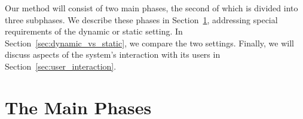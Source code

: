 Our method will consist of two main phases, the second of which is divided
into three subphases.
We describe these phases in Section~\ref{sec:phases},
addressing special requirements of the dynamic or static setting.
In Section~\ref{sec:dynamic_vs_static}, we compare the two settings.
Finally, we will discuss aspects of the system's interaction with its users
in Section~\ref{sec:user_interaction}.

\section{The Main Phases}
\label{sec:phases}

\newlength{\mainphases}%
\newlength{\subphases}\settowidth{\subphases}{\fns Answer Presentation~}%
